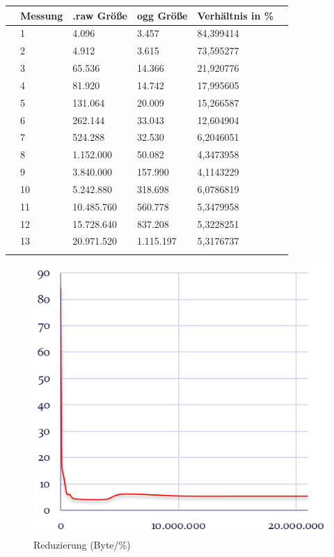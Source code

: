 \documentclass{article}
\begin{document}
			\begin{tabularx}{15cm}{p{}l|l|l|l|l}
				
				 &Messung& .raw Größe & ogg Größe & Verhältnis in \% \\
				 \hline
				 &1 &4.096 &3.457 & 84,399414 & \\
				 \hline
				 &2 &4.912 &3.615 & 73,595277 & \\
				 \hline
				 &3 &65.536 &14.366 & 21,920776 & \\
				 \hline
				 &4 &81.920 &14.742 & 17,995605 & \\
				 \hline
				 &5 &131.064 &20.009 & 15,266587 & \\
				 \hline
				 &6 &262.144 &33.043 & 12,604904 & \\
				 \hline
				 &7 &524.288 &32.530 & 6,2046051 & \\
				 \hline
				 &8 &1.152.000 &50.082 & 4,3473958 & \\
				 \hline
				 &9 &3.840.000 &157.990 & 4,1143229 & \\
				 \hline
				 &10 &5.242.880 &318.698 & 6,0786819 & \\
				 \hline
				 &11 &10.485.760 &560.778 & 5,3479958 & \\
				 \hline
				 &12 &15.728.640 &837.208 & 5,3228251 & \\
				 \hline
				 &13 &20.971.520 &1.115.197 & 5,3176737 & \\
				 
				 & & 
			\end{tabularx}
		
		\begin{figure}[h]
			\includegraphics[scale=0.5]{Bilder/Capture1.png}
			\centering
			\vspace{0 cm}
			\caption{Reduzierung (Byte/\%)}
			\label{fig16}	
		\end{figure}
	
\end{document}
